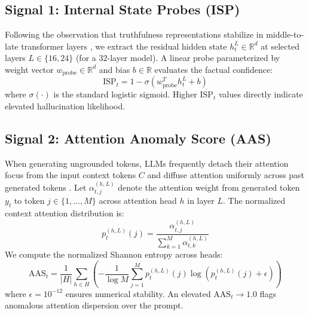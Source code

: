 \documentclass[journal]{IEEEtran}
\begin{document}
\subsection{Signal 1: Internal State Probes (ISP)}
Following the observation that truthfulness representations stabilize in middle-to-late transformer layers \cite{azaria2023internal, zhang2025mhad}, we extract the residual hidden state $h_t^L \in \mathbb{R}^d$ at selected layers $L \in \{16, 24\}$ (for a 32-layer model). A linear probe parameterized by weight vector $w_{\text{probe}} \in \mathbb{R}^d$ and bias $b \in \mathbb{R}$ evaluates the factual confidence:
\begin{equation}
    \text{ISP}_t = 1 - \sigma(w_{\text{probe}}^T h_t^L + b)
\end{equation}
where $\sigma(\cdot)$ is the standard logistic sigmoid. Higher $\text{ISP}_t$ values directly indicate elevated hallucination likelihood.

\subsection{Signal 2: Attention Anomaly Score (AAS)}
When generating ungrounded tokens, LLMs frequently detach their attention focus from the input context tokens $C$ and diffuse attention uniformly across past generated tokens \cite{hajji2025map}. Let $\alpha_{t, j}^{(h, L)}$ denote the attention weight from generated token $y_t$ to token $j \in \{1, \dots, M\}$ across attention head $h$ in layer $L$. The normalized context attention distribution is:
\begin{equation}
    p_t^{(h, L)}(j) = \frac{\alpha_{t, j}^{(h, L)}}{\sum_{k=1}^M \alpha_{t, k}^{(h, L)}}
\end{equation}
We compute the normalized Shannon entropy across heads:
\begin{equation}
    \text{AAS}_t = \frac{1}{|H|} \sum_{h \in H} \left( -\frac{1}{\log M} \sum_{j=1}^M p_t^{(h, L)}(j) \log \left( p_t^{(h, L)}(j) + \epsilon \right) \right)
\end{equation}
where $\epsilon = 10^{-12}$ ensures numerical stability. An elevated $\text{AAS}_t \to 1.0$ flags anomalous attention dispersion over the prompt.
\end{document}
